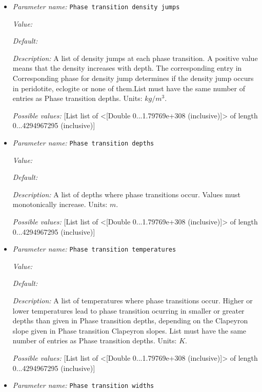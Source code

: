 \begin{itemize}
{\it Possible values:} [List list of <[Double -1.79769e+308...1.79769e+308 (inclusive)]> of length 0...4294967295 (inclusive)]
\item {\it Parameter name:} {\tt Phase transition density jumps}


{\it Value:} 


{\it Default:} 


{\it Description:} A list of density jumps at each phase transition. A positive value means that the density increases with depth. The corresponding entry in Corresponding phase for density jump determines if the density jump occurs in peridotite, eclogite or none of them.List must have the same number of entries as Phase transition depths. Units: $kg/m^3$.


{\it Possible values:} [List list of <[Double 0...1.79769e+308 (inclusive)]> of length 0...4294967295 (inclusive)]
\item {\it Parameter name:} {\tt Phase transition depths}


{\it Value:} 


{\it Default:} 


{\it Description:} A list of depths where phase transitions occur. Values must monotonically increase. Units: $m$.


{\it Possible values:} [List list of <[Double 0...1.79769e+308 (inclusive)]> of length 0...4294967295 (inclusive)]
\item {\it Parameter name:} {\tt Phase transition temperatures}


{\it Value:} 


{\it Default:} 


{\it Description:} A list of temperatures where phase transitions occur. Higher or lower temperatures lead to phase transition ocurring in smaller or greater depths than given in Phase transition depths, depending on the Clapeyron slope given in Phase transition Clapeyron slopes. List must have the same number of entries as Phase transition depths. Units: $K$.


{\it Possible values:} [List list of <[Double 0...1.79769e+308 (inclusive)]> of length 0...4294967295 (inclusive)]
\item {\it Parameter name:} {\tt Phase transition widths}



\end{itemize}
